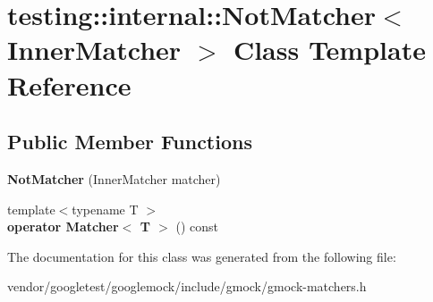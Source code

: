 \hypertarget{classtesting_1_1internal_1_1NotMatcher}{}\section{testing\+:\+:internal\+:\+:Not\+Matcher$<$ Inner\+Matcher $>$ Class Template Reference}
\label{classtesting_1_1internal_1_1NotMatcher}
\subsection*{Public Member Functions}
\begin{DoxyCompactItemize}
\item 
{\bfseries Not\+Matcher} (Inner\+Matcher matcher)\hypertarget{classtesting_1_1internal_1_1NotMatcher_a77bd397c9974e4e49acb84eeb624dce1}{}\label{classtesting_1_1internal_1_1NotMatcher_a77bd397c9974e4e49acb84eeb624dce1}

\item 
{\footnotesize template$<$typename T $>$ }\\{\bfseries operator Matcher$<$ T $>$} () const \hypertarget{classtesting_1_1internal_1_1NotMatcher_a041ad31e94163d5d6f575fae9f0f1a7c}{}\label{classtesting_1_1internal_1_1NotMatcher_a041ad31e94163d5d6f575fae9f0f1a7c}

\end{DoxyCompactItemize}


The documentation for this class was generated from the following file\+:\begin{DoxyCompactItemize}
\item 
vendor/googletest/googlemock/include/gmock/gmock-\/matchers.\+h\end{DoxyCompactItemize}
